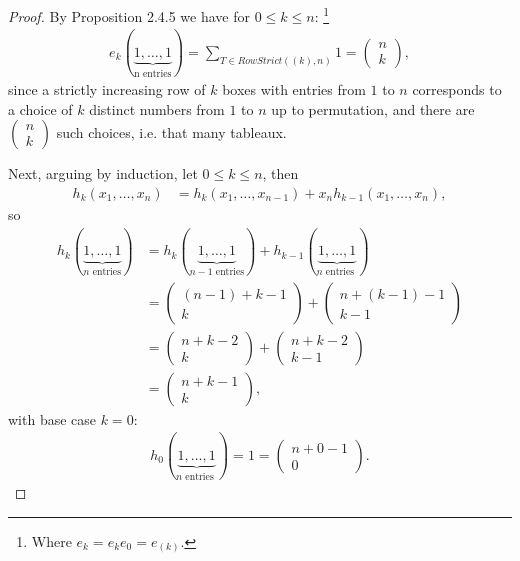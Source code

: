 \documentclass[8pt]{extarticle}
\newcommand{\<}{\langle}
\renewcommand{\>}{\rangle}
\theoremstyle{definition}
\begin{document}
\begin{proof}
  By Proposition 2.4.5 we have for $0 \leq k \leq n$: \footnote{Where $e_k = e_ke_0 = e_{(k)}$. }
  \begin{align*}
    e_k(\underbrace{1, \dots, 1}_{\text{n entries}}) = \sum\limits_{T \in RowStrict((k), n)} 1 =
    \begin{pmatrix}
      n \\
      k
    \end{pmatrix},
  \end{align*}
  since a strictly increasing row of $k$ boxes with entries from $1$ to $n$ corresponds to a choice of $k$ distinct numbers from $1$ to $n$ up to permutation, and there are
  $\begin{pmatrix}
      n \\
      k
  \end{pmatrix}$
  such choices, i.e. that many tableaux.

  Next, arguing by induction, let $0 \leq k \leq n$, then 
  \begin{align*}
    h_k(x_1, \dots, x_n)
    &= h_k(x_1, \dots, x_{n-1}) + x_n h_{k-1}(x_1, \dots, x_n),
  \end{align*}
  so
  \begin{align*}
    h_k(\underbrace{1, \dots, 1}_{n \text{ entries} })
    &= h_k(\underbrace{1, \dots, 1}_{n-1 \text{ entries} }) + h_{k-1}(\underbrace{1, \dots, 1}_{n \text{ entries }}) \\
    &=
    \begin{pmatrix}
      (n-1) + k - 1 \\
      k
    \end{pmatrix}
    +
    \begin{pmatrix}
      n + (k-1) - 1 \\
      k - 1
    \end{pmatrix}
    \\
    &=
    \begin{pmatrix}
      n + k - 2 \\
      k
    \end{pmatrix}
    +
    \begin{pmatrix}
      n + k - 2 \\
      k - 1
    \end{pmatrix}
    \\
    &=    
    \begin{pmatrix}
      n + k - 1 \\
      k
    \end{pmatrix},
  \end{align*}
  with base case $k=0$:
  \begin{align*}
    h_0(\underbrace{1, \dots, 1}_{n \text{ entries }}) = 1 =
    \begin{pmatrix}
      n + 0 - 1 \\
      0
    \end{pmatrix}.
  \end{align*}
\end{proof}
\end{document}
